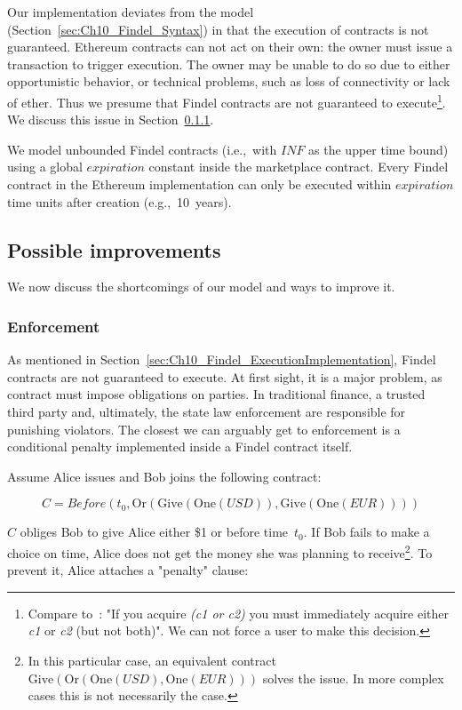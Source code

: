 Our implementation deviates from the model (Section~\ref{sec:Ch10_Findel_Syntax}) in that the execution of contracts is not guaranteed.
Ethereum contracts can not act on their own: the owner must issue a transaction to trigger execution.
The owner may be unable to do so due to either opportunistic behavior, or technical problems, such as loss of connectivity or lack of ether.
Thus we presume that Findel contracts are not guaranteed to execute\footnote{Compare to~\cite{PeytonJones2000}: "If you acquire \textit{(c1 or c2)} you must immediately acquire either \textit{c1} or \textit{c2} (but not both)". We can not force a user to make this decision.}.
We discuss this issue in Section~\ref{sec:Ch10_Findel_Enforcement}.

We model unbounded Findel contracts (i.e.,~with $INF$ as the upper time bound) using a global $expiration$ constant inside the marketplace contract.
Every Findel contract in the Ethereum implementation can only be executed within $expiration$ time units after creation (e.g.,~10~years).


\subsection{Possible improvements}

We now discuss the shortcomings of our model and ways to improve it.

\subsubsection{Enforcement} \label{sec:Ch10_Findel_Enforcement}

As mentioned in Section~\ref{sec:Ch10_Findel_ExecutionImplementation}, Findel contracts are not guaranteed to execute.
At first sight, it is a major problem, as contract must impose obligations on parties.
In traditional finance, a trusted third party and, ultimately, the state law enforcement are responsible for punishing violators.
The closest we can arguably get to enforcement is a conditional penalty implemented inside a Findel contract itself.

Assume Alice issues and Bob joins the following contract:

\[C=Before(t_0,\mathrm{Or}(\mathrm{Give}(\mathrm{One}(USD)),\mathrm{Give}(\mathrm{One}(EUR))))\]

\(C\) obliges Bob to give Alice either \$1 or  before time~$t_0$.
If Bob fails to make a choice on time, Alice does not get the money she was planning to receive\footnote{In this particular case, an equivalent contract \(\mathrm{Give}(\mathrm{Or}(\mathrm{One}(USD),\mathrm{One}(EUR)))\) solves the issue. In more complex cases this is not necessarily the case.}.
To prevent it, Alice attaches a "penalty" clause:

